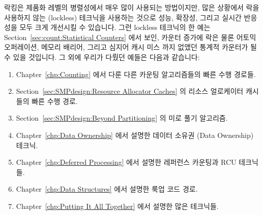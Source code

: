 락킹은 제품화 레벨의 병렬성에서 매우 많이 사용되는 방법이지만, 많은 상황에서
락을 사용하지 않는 (lockless) 테크닉을 사용하는 것으로 성능, 확장성, 그리고
실시간 반응성을 모두 크게 개선시킬 수 있습니다.
그런 lockless 테크닉의 한 예는 Section~\ref{sec:count:Statistical Counters}
에서 보인, 카운터 증가에 락은 물론 어토믹 오퍼레이션, 메모리 배리어, 그리고
심지어 캐시 미스 까지 없앴던 통계적 카운터가 될 수 있을 것입니다.
그 외에 우리가 다뤘던 예들은 다음과 같습니다:

\begin{enumerate}
\item	Chapter~\ref{chp:Counting} 에서 다룬 다른 카운팅 알고리즘들의 빠른 수행
	경로들.
\item	Section~\ref{sec:SMPdesign:Resource Allocator Caches} 의 리소스
	얼로케이터 캐시들의 빠른 수행 경로.
\item	Section~\ref{sec:SMPdesign:Beyond Partitioning} 의 미로 풀기 알고리즘.
\item	Chapter~\ref{chp:Data Ownership} 에서 설명한 데이터 소유권 (Data
	Ownership) 테크닉.
\item	Chapter~\ref{chp:Deferred Processing} 에서 설명한 레퍼런스 카운팅과 RCU
	테크닉들.
\item	Chapter~\ref{chp:Data Structures} 에서 설명한 룩업 코드 경로.
\item	Chapter~\ref{chp:Putting It All Together} 에서 설명한 많은 테크닉들.
\end{enumerate}
\iffalse

Although locking is the workhorse of parallelism in production, in
many situations performance, scalability, and real-time response can
all be greatly improved through use of lockless techniques.
A particularly impressive example of such a lockless technique are
the statistical counters described in
Section~\ref{sec:count:Statistical Counters},
which avoids not only locks, but also atomic operations, memory barriers,
and even cache misses for counter increments.
Other examples we have covered include:

\begin{enumerate}
\item	The fastpaths through a number of other counting algorithms
	in Chapter~\ref{chp:Counting}.
\item	The fastpath through resource allocator caches in
	Section~\ref{sec:SMPdesign:Resource Allocator Caches}.
\item	The maze solver in Section~\ref{sec:SMPdesign:Beyond Partitioning}.
\item	The data-ownership techniques described in
	Chapter~\ref{chp:Data Ownership}.
\item	The reference-counting and RCU techinques described in
	Chapter~\ref{chp:Deferred Processing}.
\item	The lookup code paths described in Chapter~\ref{chp:Data Structures}.
\item	Many of the techniques described in
	Chapter~\ref{chp:Putting It All Together}.
\end{enumerate}
\fi

